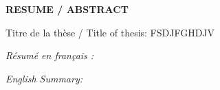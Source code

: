 
\vspace*{-3.5cm}

\begin{center}
\sffamily\large\textbf{RESUME / ABSTRACT}
\end{center}

\noindent   Titre de la thèse / Title of thesis: FSDJFGHDJV

\noindent   \sffamily\textit{Résumé en français :} \sffamily{
\begin{small}
\lipsum[2-2]
\end{small}
}

\noindent   \sffamily\textit{English Summary:}  \sffamily{
\begin{small}
\lipsum[4-4]
\end{small}
}